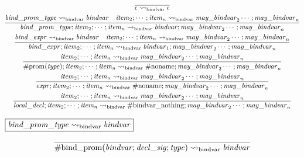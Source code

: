 \begin{gather*}
    \infer{\epsilon \rightsquigarrow_\mathrm{bindvar} \epsilon}{}
    \\
    \infer{\mathit{bind\_prom\_type}; \mathit{item}_2; \cdots; \mathit{item}_n \rightsquigarrow_\mathrm{bindvar} \mathit{bindvar}; \mathit{may\_bindvar}_2 \cdots; \mathit{may\_bindvar}_n}{
        \mathit{bind\_prom\_type} \rightsquigarrow_\mathrm{bindvar} \mathit{bindvar}
        &
        \mathit{item}_2; \cdots; \mathit{item}_n \rightsquigarrow_\mathrm{bindvar} \mathit{may\_bindvar}_2 \cdots; \mathit{may\_bindvar}_n
    }
    \\
    \infer{\mathit{bind\_expr}; \mathit{item}_2; \cdots; \mathit{item}_n \rightsquigarrow_\mathrm{bindvar} \mathit{bindvar}_1; \mathit{may\_bindvar}_2 \cdots; \mathit{may\_bindvar}_n}{
        \mathit{bind\_expr} \rightsquigarrow_\mathrm{bindvar} \mathit{bindvar}
        &
        \mathit{item}_2; \cdots; \mathit{item}_n \rightsquigarrow_\mathrm{bindvar} \mathit{may\_bindvar}_2 \cdots; \mathit{may\_bindvar}_n
    }
    \\
    \infer{\mathrm{\#prom}(\mathit{type}); \mathit{item}_2; \cdots; \mathit{item}_n \rightsquigarrow_\mathrm{bindvar} \mathrm{\#noname}; \mathit{may\_bindvar}_2 \cdots; \mathit{may\_bindvar}_n}{
        \mathit{item}_2; \cdots; \mathit{item}_n \rightsquigarrow_\mathrm{bindvar} \mathit{may\_bindvar}_2 \cdots; \mathit{may\_bindvar}_n
    }
    \\
    \infer{\mathit{expr}; \mathit{item}_2; \cdots; \mathit{item}_n \rightsquigarrow_\mathrm{bindvar} \mathrm{\#noname}; \mathit{may\_bindvar}_2 \cdots; \mathit{may\_bindvar}_n}{
        \mathit{item}_2; \cdots; \mathit{item}_n \rightsquigarrow_\mathrm{bindvar} \mathit{may\_bindvar}_2 \cdots; \mathit{may\_bindvar}_n
    }
    \\
    \infer{\mathit{local\_decl}; \mathit{item}_2; \cdots; \mathit{item}_n \rightsquigarrow_\mathrm{bindvar} \mathrm{\#bindvar\_nothing}; \mathit{may\_bindvar}_2 \cdots; \mathit{may\_bindvar}_n}{
        \mathit{item}_2; \cdots; \mathit{item}_n \rightsquigarrow_\mathrm{bindvar} \mathit{may\_bindvar}_2 \cdots; \mathit{may\_bindvar}_n
    }
\end{gather*}

$\fbox{$\mathit{bind\_prom\_type} \rightsquigarrow_\mathrm{bindvar} \mathit{bindvar}$}$

\begin{gather*}
    \infer{\mathrm{\#bind\_prom}(\mathit{bindvar}; \mathit{decl\_sig}; \mathit{type}) \rightsquigarrow_\mathrm{bindvar} \mathit{bindvar}}{}
\end{gather*}

